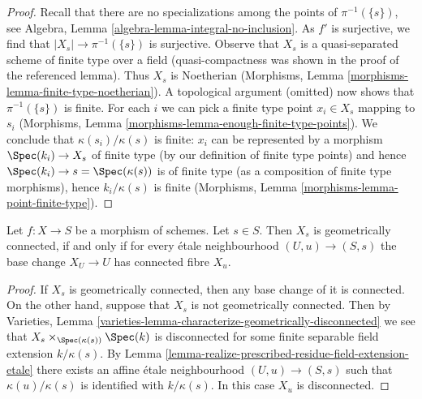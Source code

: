 \begin{proof}
Recall that there are no specializations among the points of $\pi^{-1}(\{s\})$,
see Algebra, Lemma \ref{algebra-lemma-integral-no-inclusion}.
As $f'$ is surjective, we find that $|X_s| \to \pi^{-1}(\{s\})$ is surjective.
Observe that $X_s$ is a quasi-separated scheme of finite type
over a field (quasi-compactness was shown in the proof of the
referenced lemma). Thus $X_s$ is Noetherian
(Morphisms, Lemma \ref{morphisms-lemma-finite-type-noetherian}).
A topological argument (omitted) now shows that $\pi^{-1}(\{s\})$ is finite.
For each $i$ we can pick a finite type point $x_i \in X_s$ mapping to $s_i$
(Morphisms, Lemma \ref{morphisms-lemma-enough-finite-type-points}).
We conclude that $\kappa(s_i)/\kappa(s)$ is finite:
$x_i$ can be represented by a morphism $\Spec(k_i) \to X_s$
of finite type (by our definition of finite type points)
and hence $\Spec(k_i) \to s = \Spec(\kappa(s))$ is of finite type
(as a composition of finite type morphisms),
hence $k_i/\kappa(s)$ is finite (Morphisms, Lemma
\ref{morphisms-lemma-point-finite-type}).
\end{proof}

\begin{lemma}
\label{lemma-characterize-geometrically-connected-fibres}
Let $f : X \to S$ be a morphism of schemes.
Let $s \in S$. Then $X_s$ is geometrically connected, if and
only if for every \'etale neighbourhood $(U, u) \to (S, s)$
the base change $X_U \to U$ has connected fibre $X_u$.
\end{lemma}

\begin{proof}
If $X_s$ is geometrically connected, then any base change of it is connected.
On the other hand, suppose that $X_s$ is not geometrically connected.
Then by
Varieties, Lemma
\ref{varieties-lemma-characterize-geometrically-disconnected}
we see that $X_s \times_{\Spec(\kappa(s))} \Spec(k)$ is
disconnected for some
finite separable field extension $k/\kappa(s)$. By
Lemma \ref{lemma-realize-prescribed-residue-field-extension-etale}
there exists an affine \'etale neighbourhood $(U, u) \to (S, s)$ such that
$\kappa(u)/\kappa(s)$ is identified with $k/\kappa(s)$.
In this case $X_u$ is disconnected.
\end{proof}

